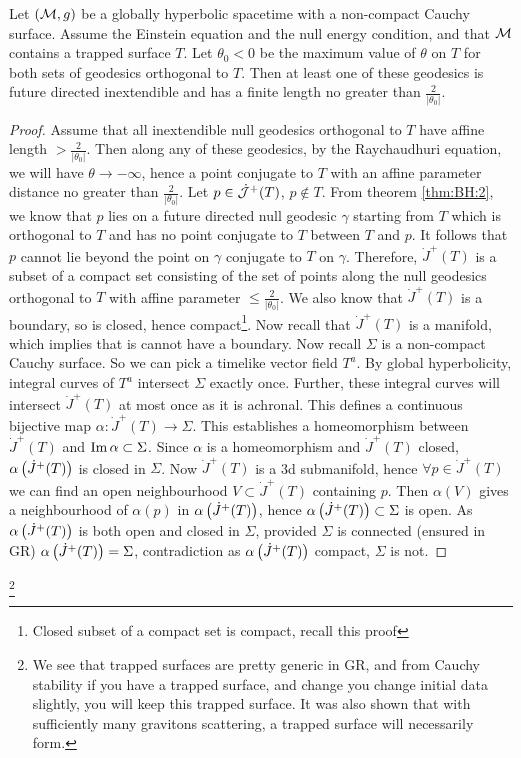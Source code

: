 \documentclass{article}
\begin{document}
\begin{theorem}
Let $(\mathcal{M},g)$ be a globally hyperbolic spacetime with a non-compact Cauchy surface. Assume the Einstein equation and the null energy condition, and that $\mathcal{M}$ contains a trapped surface $T$. Let $\theta_0<0$ be the maximum value of $\theta$ on $T$ for both sets of geodesics orthogonal to $T$. Then at least one of these geodesics is future directed inextendible and has a finite length no greater than $\frac{2}{|\theta_0|}$. 
\end{theorem}
\begin{proof}
Assume that all inextendible null geodesics orthogonal to $T$ have affine length $>\frac{2}{|\theta_0|}$. Then along any of these geodesics, by the Raychaudhuri equation, we will have $\theta \to -\infty$, hence a point conjugate to $T$ with an affine parameter distance no greater than $\frac{2}{|\theta_0|}$. Let $p\in \dot{\mathcal{J}}^+(T)$, $p\not\in T$. From theorem \ref{thm:BH:2}, we know that $p$ lies on a future directed null geodesic $\gamma$ starting from $T$ which is orthogonal to $T$ and has no point conjugate to $T$ between $T$ and $p$. It follows that $p$ cannot lie beyond the point on $\gamma$ conjugate to $T$ on $\gamma$. Therefore, $\dot{J}^+(T)$ is a subset of a compact set consisting of the set of points along the null geodesics orthogonal to $T$ with affine parameter $\leq \frac{2}{|\theta_0|}$. We also know that $\dot{J}^+(T)$ is a boundary, so is closed, hence compact\footnote{Closed subset of a compact set is compact, recall this proof}. Now recall that $\dot{J}^+(T)$ is a manifold, which implies that is cannot have a boundary. Now recall $\Sigma$ is a non-compact Cauchy surface. So we can pick a timelike vector field $T^a$. By global hyperbolicity, integral curves of $T^a$ intersect $\Sigma$ exactly once. Further, these integral curves will intersect $\dot{J}^+(T)$ at most once as it is achronal. This defines a continuous bijective map $\alpha : \dot{J}^+(T) \to \Sigma $. This establishes a homeomorphism between $\dot{J}^+(T)$ and $\operatorname{Im} \alpha \subset \Sigma$. Since $\alpha$ is a homeomorphism and $\dot{J}^+(T)$ closed, $\alpha\left( \dot{J}^+(T) \right)$ is closed in $\Sigma$. Now $\dot{J}^+(T)$ is a 3d submanifold, hence $\forall p \in \dot{J}^+(T)$ we can find an open neighbourhood $V\subset \dot{J}^+(T)$ containing $p$. Then $\alpha(V)$ gives a neighbourhood of $\alpha(p)$ in $\alpha\left( \dot{J}^+(T) \right)$, hence $\alpha\left( \dot{J}^+(T) \right)\subset\Sigma$ is open. As $\alpha\left( \dot{J}^+(T) \right)$ is both open and closed in $\Sigma$, provided $\Sigma$ is connected (ensured in GR) $\alpha\left( \dot{J}^+(T) \right)=\Sigma$, contradiction as $\alpha\left( \dot{J}^+(T) \right)$ compact, $\Sigma$ is not. 
\end{proof}\footnote{We see that trapped surfaces are pretty generic in GR, and from Cauchy stability if you have a trapped surface, and change you change initial data slightly, you will keep this trapped surface. It was also shown that with sufficiently many gravitons scattering, a trapped surface will necessarily form. }
\end{document}
